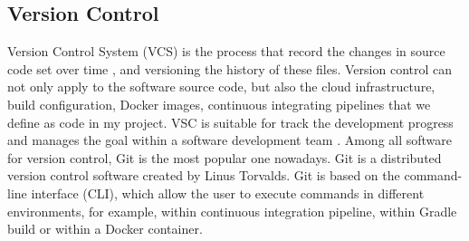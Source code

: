 \subsection{Version Control}
\label{vcs}
Version Control System (VCS) is the process that record the changes in source code set over time \cite{GitAbout93:online}, and versioning the history of these files. 
Version control can not only apply to the software source code, but also the cloud infrastructure, build configuration, Docker images, continuous integrating pipelines that we define as code in my project.
VSC is suitable for track the development progress and manages the goal within a software development team \cite{loeliger2012version}. Among all software for version control, Git is the most popular one nowadays.
Git is a distributed version control software created by Linus Torvalds. Git is based on the command-line interface (CLI), which allow the user to execute commands in different environments, for example, within continuous integration pipeline, within Gradle build or within a Docker container.

